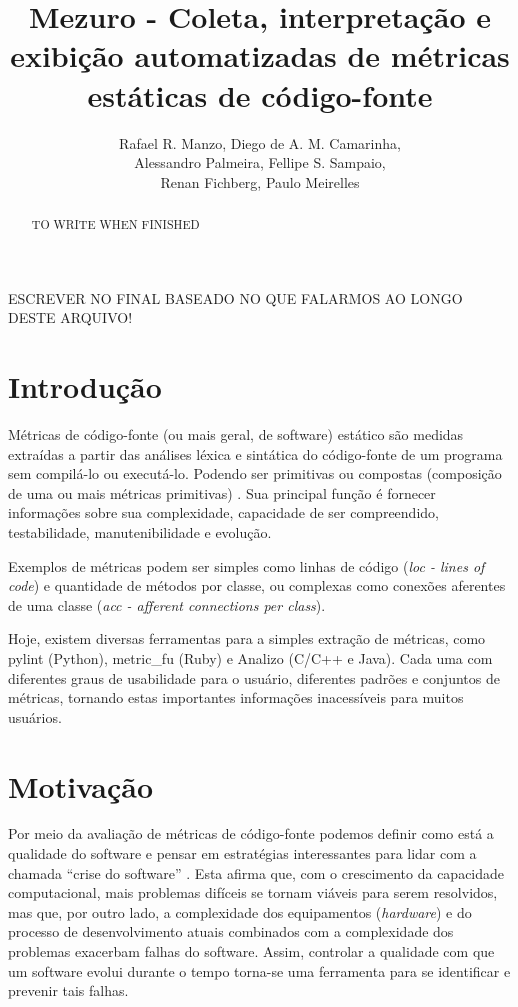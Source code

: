 \documentclass[12pt]{article}
\title{Mezuro - Coleta, interpretação e exibição automatizadas de métricas estáticas de código-fonte}
\author{Rafael R. Manzo\inst{1}, Diego de A. M. Camarinha\inst{1},\\
        Alessandro Palmeira\inst{1}, Fellipe S. Sampaio\inst{1},\\
        Renan Fichberg\inst{1}, Paulo Meirelles\inst{2}}
\begin{document}
\maketitle

\begin{abstract}
  TO WRITE WHEN FINISHED
\end{abstract}

\begin{resumo}
  ESCREVER NO FINAL BASEADO NO QUE FALARMOS AO LONGO DESTE ARQUIVO!
\end{resumo}

\section{Introdução} \label{sec:intro}
Métricas de código-fonte (ou mais geral, de software) estático são medidas extraídas a partir das análises léxica e sintática do código-fonte de um programa sem compilá-lo ou executá-lo. Podendo ser primitivas ou compostas (composição de uma ou mais métricas primitivas) \cite{m13}. Sua principal função é fornecer informações sobre sua complexidade, capacidade de ser compreendido, testabilidade, manutenibilidade e evolução\cite{m13}.

Exemplos de métricas podem ser simples como linhas de código (\textit{loc - lines of code}) e quantidade de métodos por classe, ou complexas como conexões aferentes de uma classe (\textit{acc - afferent connections per class}).

Hoje, existem diversas ferramentas para a simples extração de métricas, como pylint (Python), metric\_fu (Ruby) e Analizo (C/C++ e Java). Cada uma com diferentes graus de usabilidade para o usuário, diferentes padrões e conjuntos de métricas, tornando estas importantes informações inacessíveis para muitos usuários.

\section{Motivação}
Por meio da avaliação de métricas de código-fonte podemos definir como está a qualidade do software e pensar em estratégias interessantes para lidar com a chamada ``crise do software'' \cite{nr68}. Esta afirma que, com o crescimento da capacidade computacional, mais problemas difíceis se tornam viáveis para serem resolvidos, mas que, por outro lado, a complexidade dos equipamentos (\textit{hardware}) e do processo de desenvolvimento atuais combinados com a complexidade dos problemas exacerbam falhas do software. Assim, controlar a qualidade com que um software evolui durante o tempo torna-se uma ferramenta para se identificar e prevenir tais falhas.
\end{document}

